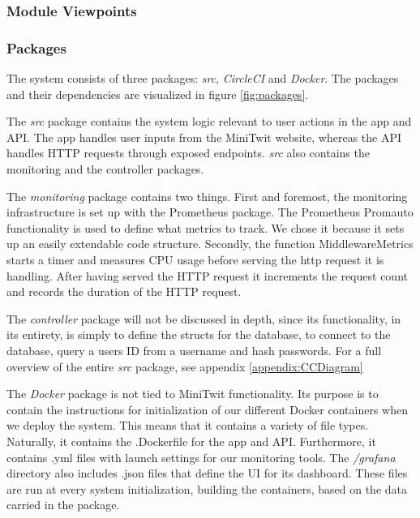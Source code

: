 \subsubsection{Module Viewpoints}

\subsubsection*{Packages}

The system consists of three packages: \textit{src}, \textit{CircleCI} and \textit{Docker}. The packages and their dependencies are visualized in figure \ref{fig:packages}.

The \textit{src} package contains the system logic relevant to user actions in the app and API. The app handles user inputs from the MiniTwit website, whereas the API handles HTTP requests through exposed endpoints. \textit{src} also contains the monitoring and the controller packages.

The \textit{monitoring} package contains two things. First and foremost, the monitoring infrastructure is set up with the Prometheus package.
The Prometheus Promauto functionality is used to define what metrics to track. We chose it because it sets up an easily extendable code structure.
Secondly, the function MiddlewareMetrics starts a timer and measures CPU usage before serving the http request it is handling. After having served the HTTP request it increments the request count and records the duration of the HTTP request. 

The \textit{controller} package will not be discussed in depth, since its functionality, in its entirety, is simply to define the structs for the database, to connect to the database, query a users ID from a username and hash passwords.
\newline
For a full overview of the entire \textit{src} package, see appendix \ref{appendix:CCDiagram}

The \textit{Docker} package is not tied to MiniTwit functionality. Its purpose is to contain the instructions for initialization of our different Docker containers when we deploy the system. This means that it contains a variety of file types. Naturally, it contains the .Dockerfile for the app and API. Furthermore, it contains .yml files with launch settings for our monitoring tools. The \textit{/grafana} directory also includes .json files that define the UI for its dashboard. \newline
These files are run at every system initialization, building the containers, based on the data carried in the package.

